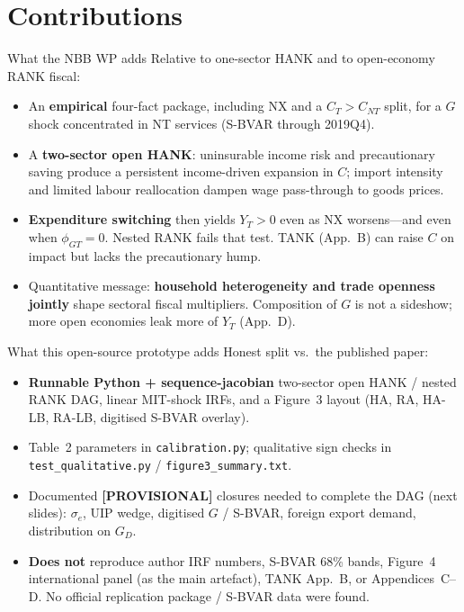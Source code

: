 \documentclass[11pt,aspectratio=169]{beamer}
\begin{document}
\section{Contributions}
\begin{frame}{What the NBB WP adds}
  Relative to one-sector HANK and to open-economy RANK fiscal:
  \begin{itemize}
    \item An \textbf{empirical} four-fact package, including NX and a
          $C_T>C_{NT}$ split, for a $G$ shock concentrated in NT services
          (S-BVAR through 2019Q4).
    \item A \textbf{two-sector open HANK}: uninsurable income risk and
          precautionary saving produce a persistent income-driven expansion
          in $C$; import intensity and limited labour reallocation dampen
          wage pass-through to goods prices.
    \item \textbf{Expenditure switching} then yields $Y_T>0$ even as NX
          worsens---and even when $\phi_{GT}=0$. Nested RANK fails that
          test. TANK (App.~B) can raise $C$ on impact but lacks the
          precautionary hump.
    \item Quantitative message: \textbf{household heterogeneity and trade
          openness jointly} shape sectoral fiscal multipliers. Composition
          of $G$ is not a sideshow; more open economies leak more of $Y_T$
          (App.~D).
  \end{itemize}
\end{frame}

\begin{frame}{What this open-source prototype adds}
  Honest split vs.\ the published paper:
  \begin{itemize}
    \item \textbf{Runnable Python + sequence-jacobian} two-sector open HANK
          / nested RANK DAG, linear MIT-shock IRFs, and a Figure~3 layout
          (HA, RA, HA-LB, RA-LB, digitised S-BVAR overlay).
    \item Table~2 parameters in \texttt{calibration.py}; qualitative sign
          checks in \texttt{test\_qualitative.py} / \texttt{figure3\_summary.txt}.
    \item Documented \textbf{[PROVISIONAL]} closures needed to complete the
          DAG (next slides): $\sigma_e$, UIP wedge, digitised $G$ / S-BVAR,
          foreign export demand, distribution on $G_D$.
    \item \textbf{Does not} reproduce author IRF numbers, S-BVAR 68\% bands,
          Figure~4 international panel (as the main artefact), TANK App.~B,
          or Appendices~C--D. No official replication package / S-BVAR data
          were found.
  \end{itemize}
\end{frame}
\end{document}
